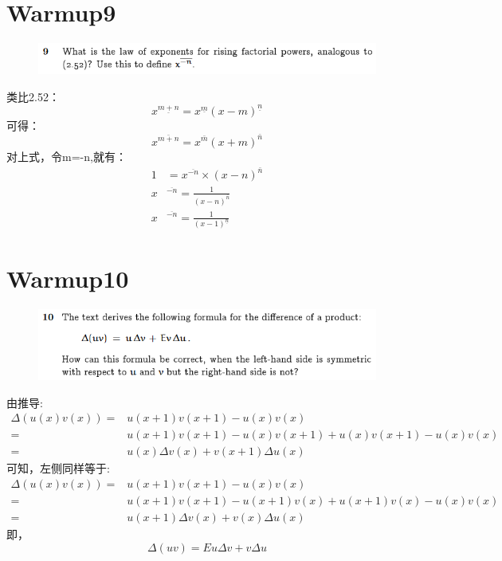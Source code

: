\documentclass[]{article}
\begin{document}
\section*{Warmup9}
\begin{figure}[H]
    \includegraphics[scale = 1]{Q3.png}
\end{figure}
类比2.52：
\begin{equation}
    x^{\underline{m+n}} = x^{\underline{m}}(x-m)^{\underline{n}}
\end{equation}
可得：
\begin{equation}
    x^{\bar{m+n}} = x^{\bar{m}}(x+m)^{\bar{n}}
\end{equation}
对上式，令m=-n,就有：
\begin{align}
    1 &= x ^ {\overline{-n}} \times (x-n) ^ {\bar{n}}\\
    x & ^ {\overline{-n}} = \frac{1}{(x-n) ^ {\bar{n}}}  \\
    x & ^ {\overline{-n}} = \frac{1}{(x-1)^{\underline{n}}}
\end{align}

\section*{Warmup10}
\begin{figure}[H]
    \includegraphics[scale = 1]{Q4.png}
\end{figure}
由推导:
\begin{align}
    \Delta(u(x)v(x))=&u(x+1)v(x+1)-u(x)v(x)\\
    =&u(x+1)v(x+1)-u(x)v(x+1)+u(x)v(x+1)-u(x)v(x)\\
    =&u(x)\Delta v(x)+v(x+1)\Delta u(x)
\end{align}
可知，左侧同样等于:
\begin{align}
    \Delta(u(x)v(x))=&u(x+1)v(x+1)-u(x)v(x)\\
    =&u(x+1)v(x+1)-u(x+1)v(x)+u(x+1)v(x)-u(x)v(x)\\
    =&u(x+1)\Delta v(x)+v(x)\Delta u(x)
\end{align}
即，
\begin{equation}
    \Delta (uv)=Eu\Delta v +v \Delta u
\end{equation}
\end{document}
